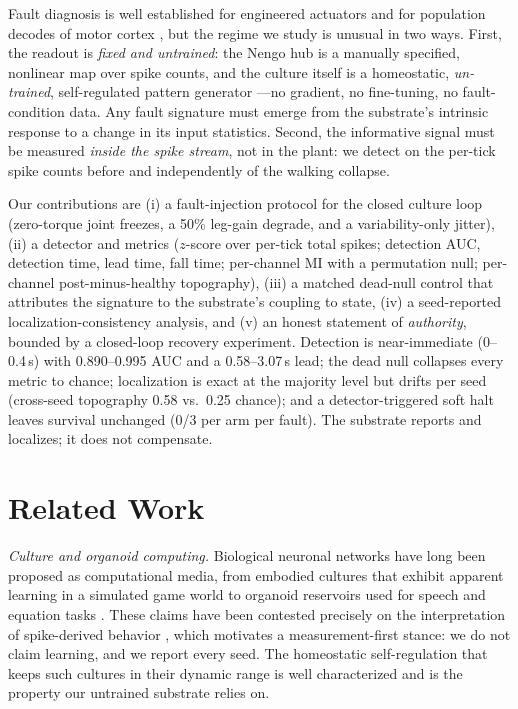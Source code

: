 Fault diagnosis is well established for engineered actuators
\cite{isermann2005,venkatasubramanian2003,chen1999,deluca2003fdi,visinsky1995fdi}
and for population decodes of motor cortex \cite{georgopoulos1986}, but the
regime we study is unusual in two ways. First,
the readout is \emph{fixed and untrained}: the Nengo hub is a manually
specified, nonlinear map over spike counts, and the culture itself is a
homeostatic, \emph{un-trained}, self-regulated pattern generator \cite{turrigiano2004}---no gradient,
no fine-tuning, no fault-condition data. Any fault signature must emerge from
the substrate's intrinsic response to a change in its input statistics. Second,
the informative signal must be measured \emph{inside the spike stream}, not in
the plant: we detect on the per-tick spike counts before and independently of
the walking collapse.

Our contributions are (i) a fault-injection protocol for the closed culture
loop (zero-torque joint freezes, a 50\% leg-gain degrade, and a
variability-only jitter), (ii) a detector and metrics ($z$-score over per-tick
total spikes; detection AUC, detection time, lead time, fall time; per-channel
MI with a permutation null; per-channel post-minus-healthy topography),
(iii) a matched dead-null control that attributes the signature to the
substrate's coupling to state, (iv) a seed-reported localization-consistency
analysis, and (v) an honest statement of \emph{authority}, bounded by a
closed-loop recovery experiment. Detection is near-immediate (0--0.4\,s) with
0.890--0.995 AUC and a 0.58--3.07\,s lead; the dead null collapses every
metric to chance; localization is exact at the majority level but drifts per
seed (cross-seed topography 0.58 vs.\ 0.25 chance); and a detector-triggered
soft halt leaves survival unchanged (0/3 per arm per fault). The substrate
reports and localizes; it does not compensate.

\section{Related Work}

\emph{Culture and organoid computing.} Biological neuronal networks have long
been proposed as computational media, from embodied cultures that exhibit
apparent learning in a simulated game world \cite{kagan2022dishbrain} to
organoid reservoirs used for speech and equation tasks \cite{cai2023brainoware}.
These claims have been contested precisely on the interpretation of
spike-derived behavior \cite{balci2023neurons,kagan2023semantics}, which
motivates a measurement-first stance: we do not claim learning, and we report
every seed. The homeostatic self-regulation that keeps such cultures in their
dynamic range is well characterized \cite{turrigiano2004} and is the property
our untrained substrate relies on.

